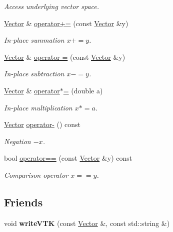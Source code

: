\begin{DoxyCompactItemize}
\begin{DoxyCompactList}\small\item\em \-Access underlying vector space. \end{DoxyCompactList}\item 
\hyperlink{classSpacy_1_1FEniCS_1_1Vector}{\-Vector} \& \hyperlink{classSpacy_1_1AddArithmeticOperators_afad1d01e1e8c6f75290ac46d9b047ea8}{operator+=} (const \hyperlink{classSpacy_1_1FEniCS_1_1Vector}{\-Vector} \&y)
\begin{DoxyCompactList}\small\item\em \-In-\/place summation $ x+=y$. \end{DoxyCompactList}\item 
\hyperlink{classSpacy_1_1FEniCS_1_1Vector}{\-Vector} \& \hyperlink{classSpacy_1_1AddArithmeticOperators_a9fa91e177d13203cfe8cfa991c64ca36}{operator-\/=} (const \hyperlink{classSpacy_1_1FEniCS_1_1Vector}{\-Vector} \&y)
\begin{DoxyCompactList}\small\item\em \-In-\/place subtraction $ x-=y$. \end{DoxyCompactList}\item 
\hyperlink{classSpacy_1_1FEniCS_1_1Vector}{\-Vector} \& \hyperlink{classSpacy_1_1AddArithmeticOperators_a1d3db95b24fd2bc1de712c9e04c47e2f}{operator$\ast$=} (double a)
\begin{DoxyCompactList}\small\item\em \-In-\/place multiplication $ x*=a$. \end{DoxyCompactList}\item 
\hyperlink{classSpacy_1_1FEniCS_1_1Vector}{\-Vector} \hyperlink{classSpacy_1_1AddArithmeticOperators_a5acd030bf265d130983fd6e3c5b68be5}{operator-\/} () const
\begin{DoxyCompactList}\small\item\em \-Negation $ -x$. \end{DoxyCompactList}\item 
bool \hyperlink{classSpacy_1_1AddArithmeticOperators_a5ff1909f49f4a705d69663dc2d4b6316}{operator==} (const \hyperlink{classSpacy_1_1FEniCS_1_1Vector}{\-Vector} \&y) const
\begin{DoxyCompactList}\small\item\em \-Comparison operator $ x==y$. \end{DoxyCompactList}\end{DoxyCompactItemize}
\subsection*{\-Friends}
\begin{DoxyCompactItemize}
\item 
\hypertarget{classSpacy_1_1FEniCS_1_1Vector_a2629dbd03686bf8d84249acc5984260a}{void {\bfseries write\-V\-T\-K} (const \hyperlink{classSpacy_1_1FEniCS_1_1Vector}{\-Vector} \&, const std\-::string \&)}\label{classSpacy_1_1FEniCS_1_1Vector_a2629dbd03686bf8d84249acc5984260a}

\end{DoxyCompactItemize}


